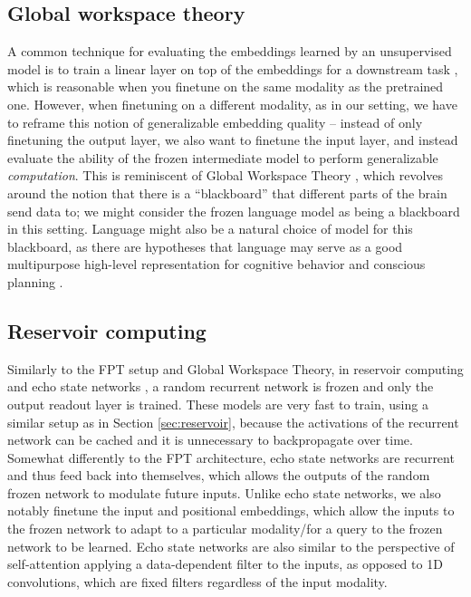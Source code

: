 \subsection{Global workspace theory} \label{sec:gwt}

A common technique for evaluating the embeddings learned by an unsupervised model is to train a linear layer on top of the embeddings for a downstream task \citep{donahue2016bigan, oord2018cpc, chen2020simclr}, which is reasonable when you finetune on the same modality as the pretrained one.
However, when finetuning on a different modality, as in our setting, we have to reframe this notion of generalizable embedding quality -- instead of only finetuning the output layer, we also want to finetune the input layer, and instead evaluate the ability of the frozen intermediate model to perform generalizable \emph{computation}.
This is reminiscent of Global Workspace Theory \citep{baars1993gwt}, which revolves around the notion that there is a ``blackboard'' that different parts of the brain send data to; we might consider the frozen language model as being a blackboard in this setting.
Language might also be a natural choice of model for this blackboard, as there are hypotheses that language may serve as a good multipurpose high-level representation for cognitive behavior and conscious planning \citep{andreas2017l3, goyal2020inductive}.

\subsection{Reservoir computing} \label{sec:resevoir}

Similarly to the FPT setup and Global Workspace Theory, in reservoir computing \citep{tanaka2019reservoir} and echo state networks \citep{jaeger2001echo, jaeger2004harnessing}, a random recurrent network is frozen and only the output readout layer is trained.
These models are very fast to train, using a similar setup as in Section \ref{sec:reservoir}, because the activations of the recurrent network can be cached and it is unnecessary to backpropagate over time.
Somewhat differently to the FPT architecture, echo state networks are recurrent and thus feed back into themselves, which allows the outputs of the random frozen network to modulate future inputs.
Unlike echo state networks, we also notably finetune the input and positional embeddings, which allow the inputs to the frozen network to adapt to a particular modality/for a query to the frozen network to be learned.
Echo state networks are also similar to the perspective of self-attention applying a data-dependent filter to the inputs, as opposed to 1D convolutions, which are fixed filters regardless of the input modality.
